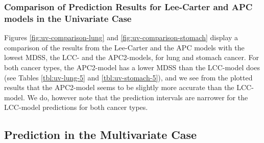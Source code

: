 \subsubsection{Comparison of Prediction Results for Lee-Carter and APC models in the Univariate Case}
\newpar Figures \ref{fig:uv-comparison-lung} and \ref{fig:uv-comparison-stomach} display a comparison of the results from the Lee-Carter and the APC models with the lowest MDSS, the LCC- and the APC2-models, for lung and stomach cancer. For both cancer types, the APC2-model has a lower MDSS than the LCC-model does (see Tables \ref{tbl:uv-lung-5} and \ref{tbl:uv-stomach-5}), and we see from the plotted results that the APC2-model seems to be slightly more accurate than the LCC-model. We do, however note that the prediction intervals are narrower for the LCC-model predictions for both cancer types.

\newpage
\subsection{Prediction in the Multivariate Case}
\label{sec:pred-mv}

